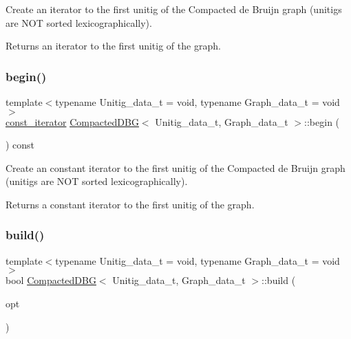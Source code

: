 Create an iterator to the first unitig of the Compacted de Bruijn graph (unitigs are N\+OT sorted lexicographically). 

\begin{DoxyReturn}{Returns}
an iterator to the first unitig of the graph. 
\end{DoxyReturn}
\mbox{\label{classCompactedDBG_ab2768195113d859b806e77b56c9b3c2f}} 
\subsubsection{\texorpdfstring{begin()}{begin()}\hspace{0.1cm}{\footnotesize\ttfamily [2/2]}}
{\footnotesize\ttfamily template$<$typename Unitig\+\_\+data\+\_\+t = void, typename Graph\+\_\+data\+\_\+t = void$>$ \\
\hyperlink{classCompactedDBG_a7725fc78ad52227df1f70d9b8f44622c}{const\+\_\+iterator} \hyperlink{classCompactedDBG}{Compacted\+D\+BG}$<$ Unitig\+\_\+data\+\_\+t, Graph\+\_\+data\+\_\+t $>$\+::begin (\begin{DoxyParamCaption}{ }\end{DoxyParamCaption}) const}



Create an constant iterator to the first unitig of the Compacted de Bruijn graph (unitigs are N\+OT sorted lexicographically). 

\begin{DoxyReturn}{Returns}
a constant iterator to the first unitig of the graph. 
\end{DoxyReturn}
\mbox{\label{classCompactedDBG_a6021ad2fe7b11998b886bc5fd9e1a4ba}} 
\subsubsection{\texorpdfstring{build()}{build()}}
{\footnotesize\ttfamily template$<$typename Unitig\+\_\+data\+\_\+t = void, typename Graph\+\_\+data\+\_\+t = void$>$ \\
bool \hyperlink{classCompactedDBG}{Compacted\+D\+BG}$<$ Unitig\+\_\+data\+\_\+t, Graph\+\_\+data\+\_\+t $>$\+::build (\begin{DoxyParamCaption}\item[{\hyperlink{structCDBG__Build__opt}{C\+D\+B\+G\+\_\+\+Build\+\_\+opt} \&}]{opt }\end{DoxyParamCaption})}



